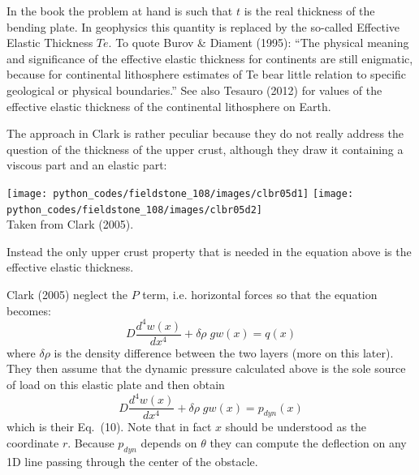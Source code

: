 In the book the problem at hand is such that $t$ is the real thickness of the bending plate. 
In geophysics this quantity is replaced by the so-called Effective Elastic Thickness $T\!e$.
To quote Burov \& Diament (1995): ``The physical meaning and significance of the effective elastic thickness
for continents are still enigmatic, because for continental lithosphere estimates of Te bear little 
relation to specific geological or physical boundaries.'' 
See also Tesauro \etal (2012) \cite{teak12} for values of the effective elastic thickness of the continental lithosphere
on Earth.

The approach in Clark \etal is rather peculiar because they do not really address the question of the thickness
of the upper crust, although they draw it containing a viscous part and an elastic part:
\begin{center}
\texttt{[image: python\_codes/fieldstone\_108/images/clbr05d1]}
\texttt{[image: python\_codes/fieldstone\_108/images/clbr05d2]}\\
{\captionfont  Taken from Clark \etal (2005). }
\end{center}
Instead the only upper crust property that is needed in the equation above is the effective elastic thickness. 



Clark \etal (2005) neglect the $P$ term, i.e. horizontal forces so that the equation becomes:
\[
D \frac{d^4w(x)}{dx^4} + \delta\!\rho \; g w(x) = q(x)
\]
where $\delta\rho$ is the density difference between the two layers (more on this later). 
They then assume that the dynamic pressure calculated above is the sole source of load on this elastic plate and then obtain 
\[
D \frac{d^4w(x)}{dx^4} + \delta\!\rho \; g w(x) = p_{dyn}(x)
\]
which is their Eq.~(10). Note that in fact $x$ should be understood as the coordinate $r$. Because $p_{dyn}$ depends on $\theta$ they can compute the deflection on any 1D line passing through the center of the obstacle. 

